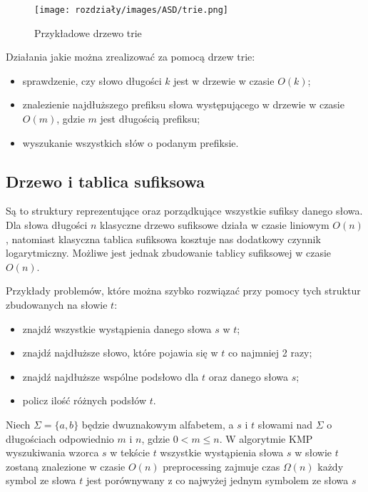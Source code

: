 \begin{figure}[H]
    \centering
    \texttt{[image: rozdziały/images/ASD/trie.png]}
    \caption{Przykładowe drzewo trie}
\end{figure}

Działania jakie można zrealizować za pomocą drzew trie:
\begin{itemize}
    \item sprawdzenie, czy słowo długości $k$ jest w drzewie w czasie $O(k)$;
    \item znalezienie najdłuższego prefiksu słowa występującego w drzewie w czasie $O(m)$, gdzie $m$ jest długością prefiksu;
    \item wyszukanie wszystkich słów o podanym prefiksie.
\end{itemize}

\subsection{Drzewo i tablica sufiksowa}
Są to struktury reprezentujące oraz porządkujące wszystkie sufiksy danego słowa. Dla słowa długości $n$ klasyczne drzewo sufiksowe działa w czasie liniowym $O(n)$, natomiast klasyczna tablica sufiksowa kosztuje nas dodatkowy czynnik logarytmiczny. Możliwe jest jednak zbudowanie tablicy sufiksowej w czasie $O(n)$.

Przykłady problemów, które można szybko rozwiązać przy pomocy tych struktur zbudowanych na słowie $t$:
\begin{itemize}
    \item znajdź wszystkie wystąpienia danego słowa $s$ w $t$;
    \item znajdź najdłuższe słowo, które pojawia się w $t$ co najmniej 2 razy;
    \item znajdź najdłuższe wspólne podsłowo dla $t$ oraz danego słowa $s$;
    \item policz ilość różnych podsłów $t$.
\end{itemize}

\begin{problems}
    \prob Niech $\Sigma = \{a, b\} $ będzie dwuznakowym alfabetem, a $s$ i $t$ słowami nad $\Sigma$ o długościach odpowiednio $m$ i $n$, gdzie $0 < m \leq n$. W algorytmie KMP wyszukiwania wzorca $s$ w tekście $t$
    \answers
    {wszystkie wystąpienia słowa $s$ w słowie $t$ zostaną znalezione w czasie $O(n)$}
    {preprocessing zajmuje czas $\Omega (n)$}
    {każdy symbol ze słowa $t$ jest porównywany z co najwyżej jednym symbolem ze słowa $s$}
\end{problems}

